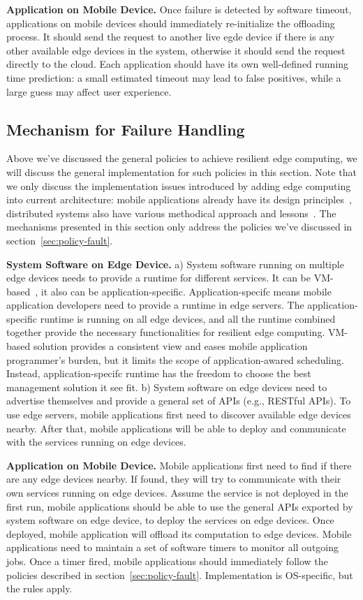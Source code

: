 \hfill\break
\noindent \textbf{Application on Mobile Device.}
Once failure is detected by software timeout, applications on mobile
devices should immediately re-initialize the offloading process. It should send the request
to another live egde device if there is any other available edge devices in the system, otherwise
it should send the request directly to the cloud. Each application should have its own well-defined
running time prediction: a small estimated timeout may lead to false positives, while a large
guess may affect user experience.

\subsection{Mechanism for Failure Handling}
\label{sec:mechanism-fault}
Above we've discussed the general policies to achieve resilient edge computing, we will discuss
the general implementation for such policies in this section. Note that we only discuss the
implementation issues introduced by adding edge computing into current architecture:
mobile applications already have its design principles~\cite{mobi-comp-principle}, distributed systems
also have various methodical approach and lessons~\cite{cavage-queue13,google-acm16}. The mechanisms
presented in this section only address the policies we've discussed in section~\ref{sec:policy-fault}.

\hfill\break
\noindent \textbf{System Software on Edge Device.}
a) System software running on multiple edge devices needs to provide a runtime for different services.
It can be VM-based~\cite{cloudlets09}, it also can be application-specific. Application-specifc means
mobile application developers need to provide a runtime in edge servers. The application-specific runtime is
running on all edge devices, and all the runtime combined together provide the necessary functionalities
for resilient edge computing. VM-based solution provides a consistent view and eases mobile application programmer's burden,
but it limits the scope of application-awared scheduling. Instead, application-specifc runtime has the freedom
to choose the best management solution it see fit.
b) System software on edge devices need to advertise themselves and provide a general set of APIs (e.g., RESTful APIs).
To use edge servers, mobile applications first need to discover available edge devices nearby. After that, mobile applications
will be able to deploy and communicate with the services running on edge devices.

\hfill\break
\noindent \textbf{Application on Mobile Device.}
Mobile applications first need to find if there are any edge devices nearby. If found, they will try to communicate with
their own services running on edge devices. Assume the service is not deployed in the first run, mobile applications should
be able to use the general APIs exported by system software on edge device, to deploy the services on edge devices.
Once deployed, mobile application will offload its computation to edge devices. Mobile applications need to maintain a
set of software timers to monitor all outgoing jobs. Once a timer fired, mobile applications should immediately follow the
policies described in section~\ref{sec:policy-fault}. Implementation is OS-specific, but the rules apply.
